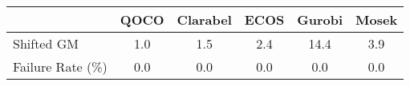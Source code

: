 \begin{tabular}{lccccc}
  \hline
   & \textbf{QOCO} & \textbf{Clarabel} & \textbf{ECOS} & \textbf{Gurobi} & \textbf{Mosek} \\ \hline
  Shifted GM & 1.0 & 1.5 & 2.4 & 14.4 & 3.9 \\ 
  Failure Rate (\%) & 0.0 & 0.0 & 0.0 & 0.0 & 0.0 \\ \hline 
\end{tabular}
